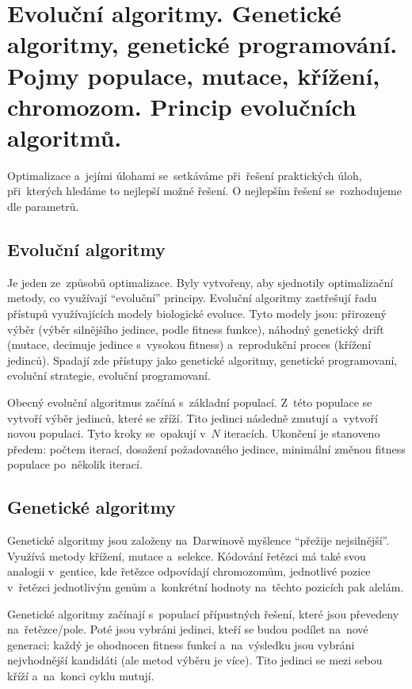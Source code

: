 \clearpage
\section{Evoluční algoritmy. Genetické algoritmy, genetické programování. Pojmy populace, mutace, křížení, chromozom. Princip evolučních algoritmů.}

Optimalizace a~jejími úlohami se~setkáváme při~řešení praktických úloh, při~kterých hledáme to nejlepší možné řešení. O nejlepším řešení se~rozhodujeme dle parametrů.

\subsection{Evoluční algoritmy}

Je jeden ze~způsobů optimalizace. Byly vytvořeny, aby sjednotily optimalizační metody, co využívají \enquote{evoluční} principy. Evoluční algoritmy zastřešují řadu přístupů využívajících modely biologické evoluce. Tyto modely jsou: přirozený výběr (výběr silnějšího jedince, podle fitness funkce), náhodný genetický drift (mutace, decimuje jedince s~vysokou fitness) a~reprodukční proces (křížení jedinců). Spadají zde přístupy jako genetické algoritmy, genetické programovaní, evoluční strategie, evoluční programovaní.

Obecný evoluční algoritmus začíná s~základní populací. Z~této populace se vytvoří výběr jedinců, které se zříží. Tito jedinci následně zmutují a~vytvoří novou populaci. Tyto kroky se~opakují v~\( N \) iteracích. Ukončení je stanoveno předem: počtem iterací, dosažení požadovaného jedince, minimální změnou fitness populace po~několik iterací.

\subsection{Genetické algoritmy}

Genetické algoritmy jsou založeny na~Darwinově myšlence \enquote{přežije nejsilnější}. Využívá metody křížení, mutace a~selekce. Kódování řetězci má také svou analogii v~gentice, kde řetězce odpovídají chromozomům, jednotlivé pozice v~řetězci jednotlivým genům a~konkrétní hodnoty na~těchto pozicích pak alelám.

Genetické algoritmy začínají s~populací přípustných řešení, které jsou převedeny na~řetězce/pole. Poté jsou vybráni jedinci, kteří se budou podílet na~nové generaci: každý je ohodnocen fitness funkcí a~na~výsledku jsou vybráni nejvhodnější kandidáti (ale metod výběru je více). Tito jedinci se mezi sebou kříží a~na~konci cyklu mutují.

